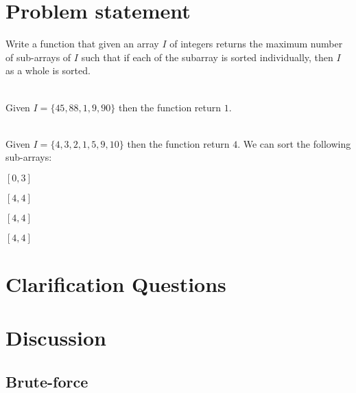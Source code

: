 \section{Problem statement}
\begin{exercise}
\label{example:max_num_chunks_sorted:exercice1}
Write a function that given an array $I$ of integers returns the maximum number of sub-arrays of $I$ 
such that if each of the subarray is sorted individually, then $I$ as a whole is sorted.

	\begin{example}
		\label{example:max_num_chunks_sorted:example1}
		\hfill \\
		Given $I=\{45,88,1,9,90\}$ then the function return $1$.
		
	\end{example}

	\begin{example}
		\label{example:max_num_chunks_sorted:example2}
		\hfill \\
		Given $I=\{4,3,2,1,5,9,10\}$ then the function return $4$. We can sort the following sub-arrays:
		\begin{itemize*}
			\item $[0,3]$
			\item $[4,4]$
			\item $[4,4]$
			\item $[4,4]$
		\end{itemize*}
	\end{example}
\end{exercise}

\section{Clarification Questions}

\begin{QandA}
	\item 
	\begin{answered}
		\textit{}
	\end{answered}
	
\end{QandA}

\section{Discussion}
\label{max_num_chunks_sorted:sec:discussion}


\subsection{Brute-force}
\label{max_num_chunks_sorted:sec:bruteforce}

\begin{minipage}{\linewidth}
	
\end{minipage}

